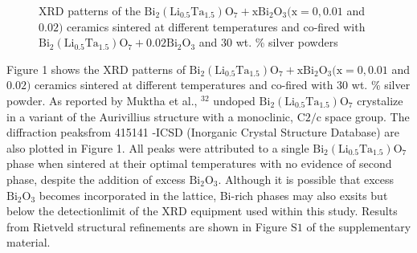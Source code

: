 \documentclass[a4paper,14pt]{extreport}
\begin{document}
\newpage
\begin{figure}[h]
\caption{XRD patterns of the $\mathrm{Bi}_{2}\left(\mathrm{Li}_{0.5} \mathrm{Ta}_{1.5}\right) \mathrm{O}_{7}+\mathrm{xBi}_{2} \mathrm{O}_{3}(\mathrm{x}=0,0.01$ and $0.02)$ ceramics
sintered at different temperatures and co-fired with $\mathrm{Bi}_{2}\left(\mathrm{Li}_{0.5} \mathrm{Ta}_{1.5}\right) \mathrm{O}_{7}+0.02 \mathrm{Bi}_{2} \mathrm{O}_{3}$ and
30 wt. \% silver powders}
\label{ris1}
\end{figure}

  Figure 1 shows the XRD patterns of $\mathrm{Bi}_{2}\left(\mathrm{Li}_{0.5} \mathrm{Ta}_{1.5}\right) \mathrm{O}_{7}+\mathrm{xBi}_{2} \mathrm{O}_{3}(\mathrm{x}=0,0.01$ and $0.02)$
ceramics sintered at different temperatures and co-fired with 30 wt. \% silver powder.
As reported by Muktha et al., $^{32}$ undoped $\mathrm{Bi}_{2}\left(\mathrm{Li}_{0.5} \mathrm{Ta}_{1.5}\right) \mathrm{O}_{7}$ crystalize in a variant of the
Aurivillius structure with a monoclinic, $\mathrm{C} 2 / \mathrm{c}$ space group. The diffraction peaksfrom
415141 -ICSD (Inorganic Crystal Structure Database) are also plotted in Figure 1. All
peaks were attributed to a single $\mathrm{Bi}_{2}\left(\mathrm{Li}_{0.5} \mathrm{Ta}_{1.5}\right) \mathrm{O}_{7}$ phase when sintered at their optimal
temperatures with no evidence of second phase, despite the addition of excess $\mathrm{Bi}_{2} \mathrm{O}_{3} .$
Although it is possible that excess $\mathrm{Bi}_{2} \mathrm{O}_{3}$ becomes incorporated in the lattice, Bi-rich
phases may also exsits but below the detectionlimit of the XRD equipment used
within this study. Results from Rietveld structural refinements are shown in Figure $\mathrm{S} 1$
of the supplementary material.
\end{document}
